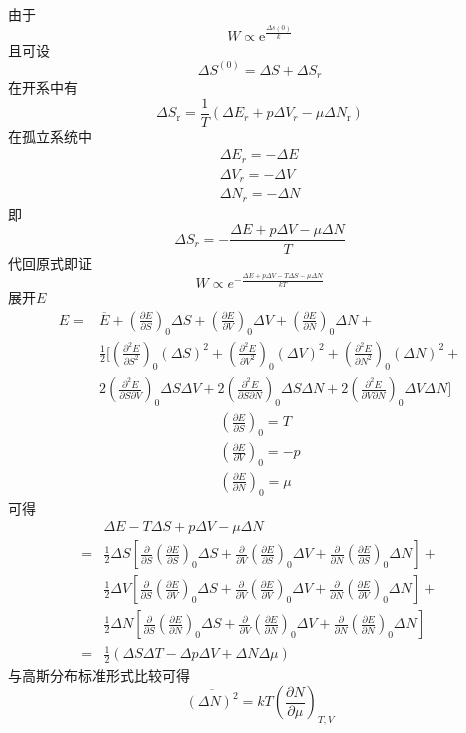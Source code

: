 \documentclass[UTF8,9pt]{ctexart}
\begin{document}
由于$$ 
W \propto \mathrm{e}^{\frac{\Delta s(0)}{k}}
 $$且可设$$ 
 \Delta S^{(0)}=\Delta S+\Delta S_r
  $$
  在开系中有$$ 
  \Delta S_{\mathrm{r}}=\frac{1}{T}\left(\Delta E_{r}+p \Delta V_{r}-\mu \Delta N_{\mathrm{r}}\right)
   $$
   在孤立系统中$$ 
\begin{array}{l}{\Delta E_{r}=-\Delta E} \\ {\Delta V_{r}=-\Delta V} \\ {\Delta N_{r}=-\Delta N}\end{array}
 $$
 即$$ 
 \Delta S_{r}=-\frac{\Delta E+p \Delta V-\mu \Delta N}{T}
  $$
  代回原式即证$$ 
  W \propto e^{-\frac{\Delta E+p \Delta V-T \Delta S-\mu \Delta N}{k T}}
   $$展开$E$
   $$ 
\begin{aligned} E=& \overline{E}+\left(\frac{\partial E}{\partial S}\right)_{0} \Delta S+\left(\frac{\partial E}{\partial V}\right)_{0} \Delta V+\left(\frac{\partial E}{\partial N}\right)_{0} \Delta N+\\ & \frac{1}{2}\left.\bigg[\left(\frac{\partial^{2} E}{\partial S^{2}}\right)_{0}(\Delta S)^{2}+\left(\frac{\partial^{2} E}{\partial V^{2}}\right)_{0}(\Delta V)^{2}+\left(\frac{\partial^{2} E}{\partial N^{2}}\right)_{0}(\Delta N)^{2}+\right.\\ & 2\left(\frac{\partial^{2} E}{\partial S \partial V}\right)_{0} \Delta S \Delta V+2\left(\frac{\partial^{2} E}{\partial S \partial N}\right)_{0} \Delta S \Delta N+2\left(\frac{\partial^{2} E}{\partial V \partial N}\right)_{0} \Delta V \Delta N \bigg]\end{aligned}
 $$
 $$ 
\begin{array}{l}{\left(\frac{\partial E}{\partial S}\right)_{0}=T} \\ {\left(\frac{\partial E}{\partial V}\right)_{0}=-p} \\ {\left(\frac{\partial E}{\partial N}\right)_{0}=\mu}\end{array}
 $$
 可得$$ 
\begin{aligned} & \Delta E-T \Delta S+p \Delta V-\mu \Delta N \\=& \frac{1}{2} \Delta S\left[\frac{\partial}{\partial S}\left(\frac{\partial E}{\partial S}\right)_{0} \Delta S+\frac{\partial}{\partial V}\left(\frac{\partial E}{\partial S}\right)_{0} \Delta V+\frac{\partial}{\partial N}\left(\frac{\partial E}{\partial S}\right)_{0} \Delta N\right]+\\ & \frac{1}{2} \Delta V\left[\frac{\partial}{\partial S}\left(\frac{\partial E}{\partial V}\right)_{0} \Delta S+\frac{\partial}{\partial V}\left(\frac{\partial E}{\partial V}\right)_{0} \Delta V+\frac{\partial}{\partial N}\left(\frac{\partial E}{\partial V}\right)_{0} \Delta N\right]+\\ & \frac{1}{2} \Delta N\left[\frac{\partial}{\partial S}\left(\frac{\partial E}{\partial N}\right)_{0} \Delta S+\frac{\partial}{\partial V}\left(\frac{\partial E}{\partial N}\right)_{0} \Delta V+\frac{\partial}{\partial N}\left(\frac{\partial E}{\partial N}\right)_{0} \Delta N\right] \\=& \frac{1}{2}(\Delta S \Delta T-\Delta p \Delta V+\Delta N \Delta \mu) \end{aligned}
 $$与高斯分布标准形式比较可得$$ 
 \overline{(\Delta N)^{2}}=k T\left(\frac{\partial N}{\partial \mu}\right)_{T, V}
  $$
\end{document}
